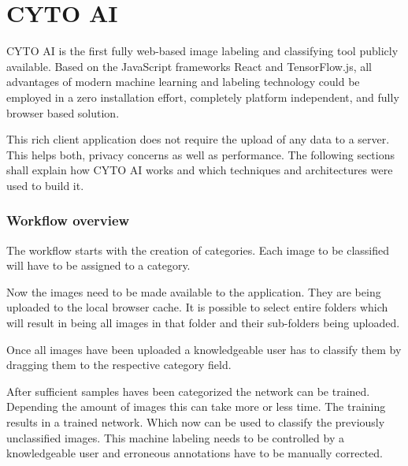 \chapter{CYTO AI}

CYTO AI is the first fully web-based image labeling and classifying tool publicly available. Based on the JavaScript frameworks React and TensorFlow.js,
all advantages of modern machine learning and labeling
technology could be employed in a zero installation effort,
completely platform independent, and fully browser based
solution.

This rich client application does not require the upload of
any data to a server. This helps both, privacy concerns as well as performance. The following sections shall explain how CYTO AI works and which techniques and architectures were used to build it.


\subsection{Workflow overview}

The workflow starts with the creation of categories. Each image to be classified will have to be assigned to a category.

Now the images need to be made available to the application.
They are being uploaded to the local browser cache.
It is possible to select entire folders which will result in being all images in that folder and their sub-folders being uploaded.

Once all images have been uploaded a knowledgeable user has
to classify them by dragging them to the respective category field.

After sufficient samples haves been categorized the network
can be trained. Depending the amount of images this can take more or less time. The training results in a trained network.
Which now can be used to classify the previously
unclassified images. This machine labeling needs to
be controlled by a knowledgeable user
and erroneous annotations have to be manually corrected.

